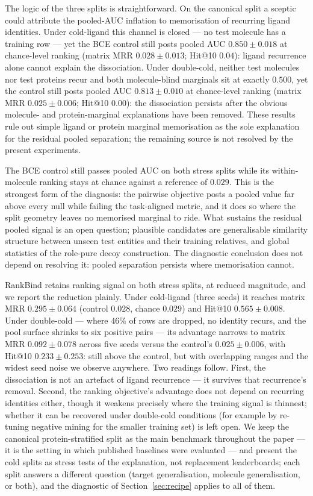 \documentclass[11pt,a4paper]{article}
\newcommand{\method}{RankBind\xspace}
\newcommand{\mrr}{matrix MRR}
\begin{document}
The logic of the three splits is straightforward. On the canonical split a
sceptic could attribute the pooled-AUC inflation to memorisation of
recurring ligand identities. Under cold-ligand this channel is closed ---
no test molecule has a training row --- yet the BCE control still posts
pooled AUC $0.850 \pm 0.018$ at chance-level ranking (\mrr{} $0.028 \pm
0.013$; Hit@10 $0.04$): ligand recurrence alone cannot explain the
dissociation. Under double-cold, neither test molecules nor test proteins
recur and both molecule-blind marginals sit at exactly $0.500$, yet the
control still posts pooled AUC $0.813 \pm 0.010$ at chance-level ranking
(\mrr{} $0.025 \pm 0.006$; Hit@10 $0.00$): the dissociation persists after
the obvious molecule- and protein-marginal explanations have been removed.
These results rule out simple ligand or protein marginal memorisation as
the sole explanation for the residual pooled separation; the remaining
source is not resolved by the present experiments.

The BCE control still passes pooled AUC on both stress splits while its
within-molecule ranking stays at chance against a reference of $0.029$.
This is the strongest form of the diagnosis: the pairwise objective posts
a pooled value far above every null while failing the task-aligned metric,
and it does so where the split geometry leaves no memorised marginal to
ride. What sustains the residual pooled signal is an open question;
plausible candidates are generalisable similarity structure between unseen
test entities and their training relatives, and global statistics of the
role-pure decoy construction. The diagnostic conclusion does not depend on
resolving it: pooled separation persists where memorisation cannot.

\method{} retains ranking signal on both stress splits, at reduced
magnitude, and we report the reduction plainly. Under cold-ligand (three
seeds) it reaches
\mrr{} $0.295 \pm 0.064$ (control $0.028$, chance $0.029$) and Hit@10
$0.565 \pm 0.008$. Under double-cold --- where $46\%$ of rows are dropped,
no identity recurs, and the pool surface shrinks to six positive pairs ---
its advantage narrows to \mrr{} $0.092 \pm 0.078$ across five seeds versus
the control's $0.025 \pm 0.006$, with Hit@10 $0.233 \pm 0.253$: still above
the control, but with overlapping ranges and the widest seed noise we
observe anywhere. Two readings follow. First, the dissociation is not an
artefact of ligand recurrence --- it survives that recurrence's removal.
Second, the ranking objective's advantage does not depend on recurring
identities either, though it weakens precisely where the training signal is
thinnest; whether it can be recovered under double-cold conditions (for
example by re-tuning negative mining for the smaller training set) is left
open. We keep the canonical protein-stratified split as the main benchmark
throughout the paper --- it is the setting in which published baselines were
evaluated --- and present the cold splits as stress tests of the
explanation, not replacement leaderboards; each split answers a different
question (target generalisation, molecule generalisation, or both), and the
diagnostic of Section~\ref{sec:recipe} applies to all of them.
\end{document}
